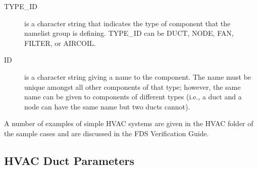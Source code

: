 \documentclass[11pt]{book}
\begin{document}
\begin{description}
\item[{\ct TYPE\_ID}] is a character string that indicates the type of component that the namelist group is defining.   {\ct TYPE\_ID} can be {\ct DUCT}, {\ct NODE}, {\ct FAN}, {\ct FILTER}, or {\ct AIRCOIL}.
\item[{\ct ID}] is a character string giving a name to the component.  The name must be unique amongst all other components of that type; however, the same name can be given to components of different types (i.e., a duct and a node can have the same name but two ducts cannot).
\end{description}
A number of examples of simple HVAC systems are given in the HVAC folder of the sample cases and are discussed in the FDS Verification Guide.



\subsection{HVAC Duct Parameters}
\label{info:HVACduct}
\end{document}
